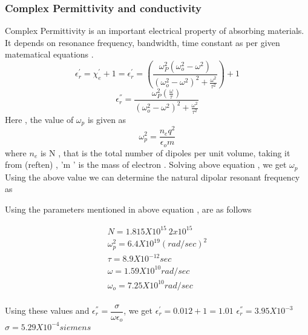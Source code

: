 \documentclass[journal]{IEEEtran}
\begin{document}
\subsubsection{Complex Permittivity and conductivity}
Complex Permittivity is an important electrical property of absorbing materials. It depends on resonance frequency, bandwidth, time constant as per given matematical  equations \cite{booke}.
\begin{equation}
\epsilon^{'}_{r } = \chi^{'}_{e} + 1 =
\epsilon^{'}_r = (\dfrac{\omega^2_P (\omega^2_o - \omega^2)}{(\omega^2_o - \omega^2)^2 + \frac{\omega^2}{\tau^2}}) + 1
\end{equation}
\begin{equation}
\epsilon^{''}_{r } = \dfrac{\omega^2_P (\frac{\omega}{\tau})}{(\omega^2_o - \omega^2)^2 + \frac{\omega^2}{\tau^2}}
\end{equation}
Here , the value of $\omega_p $ is given as
\begin{equation}
\omega^2_p = \dfrac{n_e q^2}{\epsilon_o m}
\end{equation}
where $n_e$ is N , that is the total number of dipoles per unit volume, taking it from (ref{ten}) , 'm ' is the mass of electron . Solving above equation , we get $\omega_p$
Using the above value we can determine the natural dipolar resonant frequency as

Using the parameters mentioned in above equation , are as follows

\begin{align*}
N = 1.815 X 10^{15}  ~ 2 x 10^{15} \\
\omega^2_p = 6.4 X 10^{19} (rad/sec)^2 \\
\tau = 8.9 X 10^{-12} sec\\
\omega = 1.59 X 10^{10} rad/sec\\
\omega_o = 7.25 X 10^{10} rad/sec\\
\end{align*}

Using these values and $ \epsilon^{''}_r = \dfrac{\sigma}{\omega \epsilon_o}$, we get
$\epsilon^{'}_r = 0.012 + 1 = 1.01 $
$\epsilon^{''}_r = 3.95X 10^{-3}$
$ \sigma = 5.29 X 10^{-4} siemens$

\end{document}
